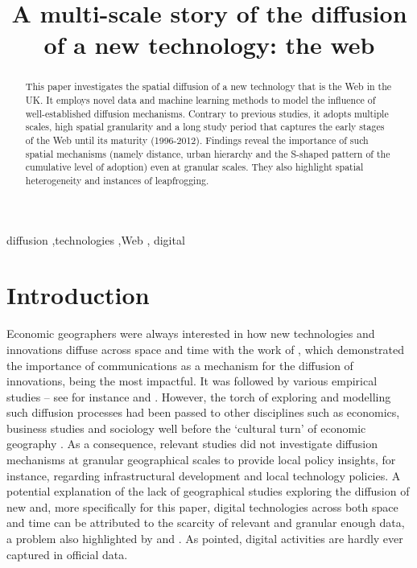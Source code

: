 \documentclass[
  authoryear,
  preprint,
  3p]{elsarticle}
\begin{document}
\begin{frontmatter}
\title{A multi-scale story of the diffusion of a new technology: the
web}


        
\begin{abstract}
This paper investigates the spatial diffusion of a new technology that
is the Web in the UK. It employs novel data and machine learning methods
to model the influence of well-established diffusion mechanisms.
Contrary to previous studies, it adopts multiple scales, high spatial
granularity and a long study period that captures the early stages of
the Web until its maturity (1996-2012). Findings reveal the importance
of such spatial mechanisms (namely distance, urban hierarchy and the
S-shaped pattern of the cumulative level of adoption) even at granular
scales. They also highlight spatial heterogeneity and instances of
leapfrogging.
\end{abstract}





\begin{keyword}
    diffusion \sep technologies \sep Web \sep 
    digital
\end{keyword}
\end{frontmatter}
    

\section{Introduction}\label{sec-introduction}

Economic geographers were always interested in how new technologies and
innovations diffuse across space and time with the work of
\citet{hagerstrand1968innovation}, which demonstrated the importance of
communications as a mechanism for the diffusion of innovations, being
the most impactful. It was followed by various empirical studies -- see
for instance \citet{ormrod1990} and \citet{iso2005}. However, the torch
of exploring and modelling such diffusion processes had been passed to
other disciplines such as economics, business studies and sociology well
before the `cultural turn' of economic geography
\citep{perkins2005international, ding2010modeling}. As a consequence,
relevant studies did not investigate diffusion mechanisms at granular
geographical scales to provide local policy insights, for instance,
regarding infrastructural development and local technology policies. A
potential explanation of the lack of geographical studies exploring the
diffusion of new and, more specifically for this paper, digital
technologies across both space and time can be attributed to the
scarcity of relevant and granular enough data, a problem also
highlighted by \citet{iso2005} and \citet{kemeny2011international}. As
\citet{zook2022mapping} pointed, digital activities are hardly ever
captured in official data.
\end{document}
